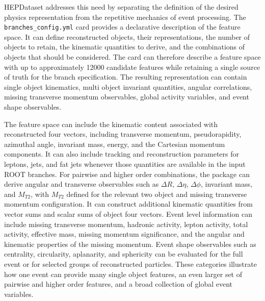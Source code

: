 \documentclass[11pt,a4paper]{article}
\begin{document}
HEPDataset addresses this need by separating the definition of the desired
physics representation from the repetitive mechanics of event processing. The
\texttt{branches\_config.yml} card provides a declarative description of the
feature space. It can define reconstructed objects, their representations, the
number of objects to retain, the kinematic quantities to derive, and the
combinations of objects that should be considered. The card can therefore
describe a feature space with up to approximately 12000 candidate features while
retaining a single source of truth for the branch specification. The resulting
representation can contain single object kinematics, multi object invariant
quantities, angular correlations, missing transverse momentum observables,
global activity variables, and event shape observables.

The feature space can include the kinematic content associated with
reconstructed four vectors, including transverse momentum, pseudorapidity,
azimuthal angle, invariant mass, energy, and the Cartesian momentum components.
It can also include tracking and reconstruction parameters for leptons, jets,
and fat jets whenever those quantities are available in the input ROOT branches.
For pairwise and higher order combinations, the package can derive angular and
transverse observables such as $\Delta R$, $\Delta\eta$, $\Delta\phi$,
invariant mass, and $M_{T2}$, with $M_{T2}$ defined for the relevant two object
and missing transverse momentum configuration. It can construct additional
kinematic quantities from vector sums and scalar sums of object four vectors.
Event level information can include missing transverse momentum, hadronic
activity, lepton activity, total activity, effective mass, missing momentum
significance, and the angular and kinematic properties of the missing momentum.
Event shape observables such as centrality, circularity, aplanarity, and
sphericity can be evaluated for the full event or for selected groups of
reconstructed particles. These categories illustrate how one event can provide
many single object features, an even larger set of pairwise and higher order
features, and a broad collection of global event variables.
\end{document}
